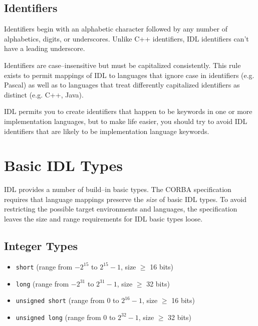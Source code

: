 \subsection{Identifiers}
Identifiers begin with an alphabetic character followed by any number of
alphabetics, digits, or underscores. Unlike C++ identifiers, IDL identifiers
can't have a leading underscore.

Identifiers are case--insensitive but must be capitalized consistently. 
This rule exists to permit mappings of IDL to languages that ignore case in
identifiers (e.g. Pascal) as well as to languages that treat differently
capitalized identifiers as distinct (e.g. C++, Java).

IDL permits you to create identifiers that happen to be keywords in one or more
implementation languages, but to make life easier, you should try to avoid IDL
identifiers that are likely to be implementation language keywords.

\newpage
\section{Basic IDL Types}
IDL provides a number of build--in basic types. 
The CORBA specification requires that language mappings preserve the {\it size}
of basic IDL types.
To avoid restricting the possible target environments and languages, the 
specification leaves the size and range requirements for IDL basic types loose.


\subsection{Integer Types}

\begin{itemize}
  \item {\tt short} (range from $-2^{15}$ to $2^{15}-1$, size $\geq$ 16 bits)
  \item {\tt long} (range from $-2^{31}$ to $2^{31}-1$, size $\geq$ 32 bits)
  \item {\tt unsigned short} (range from $0$ to $2^{16}-1$, size  $\geq$
  16 bits)
  \item {\tt unsigned long} (range from $0$ to $2^{32}-1$, size $\geq$ 32
  bits)
\end{itemize}

